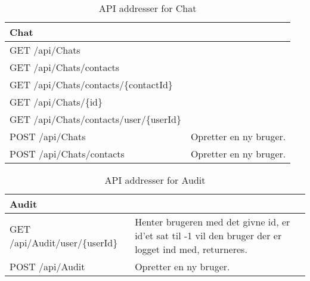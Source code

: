 \begin{table}[H]
	\centering
	\caption{API addresser for Chat}
	\label{tab:web_user}
	\begin{tabular}{p{5cm}|p{11cm}}
		\hline
		\multicolumn{2}{l}{\textbf{Chat}}\\
		\hline
		GET \newline
		/api/Chats &
		 \\
		\hline
		GET \newline
		/api/Chats/contacts &
		 \\
		\hline
		GET \newline
		/api/Chats/contacts/\{contactId\} &
		 \\
		\hline
		GET \newline
		/api/Chats/\{id\} &
		 \\
		\hline
		GET \newline
		/api/Chats/contacts/user/\{userId\} &
		 \\
		\hline
		POST \newline
		/api/Chats &
		Opretter en ny bruger. \\
		\hline
		POST \newline
		/api/Chats/contacts &
		Opretter en ny bruger. \\
		\hline
	
	\end{tabular}
\end{table}


\begin{table}[H]
	\centering
	\caption{API addresser for Audit}
	\label{tab:web_user}
	\begin{tabular}{p{5cm}|p{11cm}}
		\hline
		\multicolumn{2}{l}{\textbf{Audit}}\\
		\hline
		GET \newline
		/api/Audit/user/\{userId\} & Henter brugeren med det givne id, er id'et sat til -1 vil den bruger der er logget ind med, returneres. \\
		\hline
		POST \newline
		/api/Audit &
		Opretter en ny bruger. \\
		\hline
	
	\end{tabular}
\end{table}
